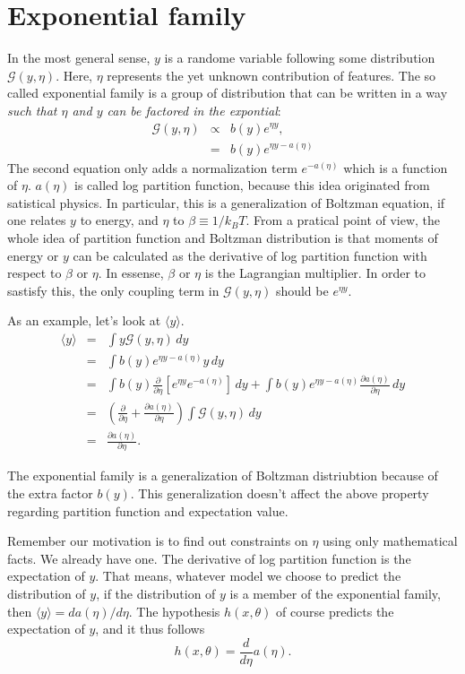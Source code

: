 \section{Exponential family}
In the most general sense, $y$ is a randome variable following some distribution $\mathcal G(y, \eta)$. Here, $\eta$ represents the yet unknown contribution of features. The so called exponential family is a group of distribution that can be written in a way \emph{such that $\eta$ and $y$ can be factored in the expontial}:
\begin{eqnarray}
	\mathcal G(y, \eta) &\propto& b(y)e^{\eta y},\\
			 &=& b(y)e^{\eta y - a(\eta)}\label{eqn:exponential-family}
\end{eqnarray}
The second equation only adds a normalization term $e^{-a(\eta)}$ which is a function of $\eta$. $a(\eta)$ is called log partition function, because this idea originated from satistical physics. In particular, this is a generalization of Boltzman equation, if one relates $y$ to energy, and $\eta$ to $\beta\equiv 1/k_BT$. From a pratical point of view, the whole idea of partition function and Boltzman distribution is that moments of energy or $y$ can be calculated as the derivative of log partition function with respect to $\beta$ or $\eta$. In essense, $\beta$ or $\eta$ is the Lagrangian multiplier. In order to sastisfy this, the only coupling term in $\mathcal G(y, \eta)$ should be $e^{\eta y}$.

As an example, let's look at $\langle y\rangle$.
\begin{eqnarray}
	\langle y\rangle &=&\int y\mathcal G(y, \eta)\, dy\\
		   &=&\int b(y)e^{\eta y -a(\eta)}y\,dy\\
     &=&\int b(y)\frac{\partial}{\partial\eta}\left[e^{\eta y}e^{-a(\eta)}\right]\,dy + \int b(y)e^{\eta y-a(\eta)}\frac{\partial a(\eta)}{\partial\eta}\,dy\\
	&=&(\frac{\partial}{\partial\eta}+ \frac{\partial a(\eta)}{\partial\eta})\int \mathcal G(y, \eta)\, dy\\
	&=&\frac{\partial a(\eta)}{\partial\eta}.\label{eqn:average}
\end{eqnarray}

The exponential family is a generalization of Boltzman distriubtion because of the extra factor $b(y)$. This generalization doesn't affect the above property regarding partition function and expectation value.

Remember our motivation is to find out constraints on $\eta$ using only mathematical facts. We already have one. The derivative of log partition function is the expectation of $y$. That means, whatever model we choose to predict the distribution of $y$, if the distribution of $y$ is a member of the exponential family, then $\langle y\rangle=da(\eta)/d\eta$. The hypothesis $h(x, \theta)$ of course predicts the expectation of $y$, and it thus follows
\begin{equation}
	h(x, \theta) = \frac{d}{d\eta}a(\eta). \label{eqn:exponential_hypo}
\end{equation}

